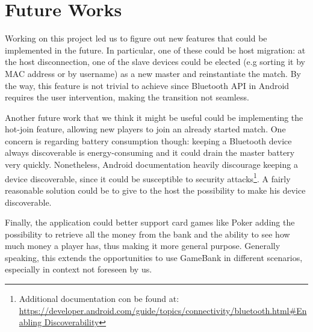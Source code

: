 \section{Future Works}
\label{future_works}

Working on this project led us to figure out new features that could be 
implemented in the future. In particular, one of these could be host migration: 
at the host disconnection, one of the slave devices could be elected 
(e.g sorting it by MAC address or by username) as a new master and reinstantiate 
the match. 
By the way, this feature is not trivial to achieve since Bluetooth API in 
Android requires the user intervention, making the transition not seamless.

Another future work that we think it might be useful could be implementing 
the hot-join feature, allowing new players to join an already started match. 
One concern is regarding battery consumption though: keeping a Bluetooth device 
always discoverable is energy-consuming and it could drain the master battery 
very quickly. Nonetheless, Android documentation heavily discourage keeping a 
device discoverable, since it could be susceptible to security 
attacks\footnote{Additional documentation con be found at: \url{ 
https://developer.android.com/guide/topics/connectivity/bluetooth.html\#Enabling
Discoverability}}.
A fairly reasonable solution could be to give to the host the possibility to 
make his device discoverable.

Finally, the application could better support card games like Poker adding the 
possibility to retrieve all the money from the bank and the ability to see 
how much money a player has, thus making it more general purpose. Generally 
speaking, this extends the opportunities to use GameBank in different scenarios, 
especially in context not foreseen by us.